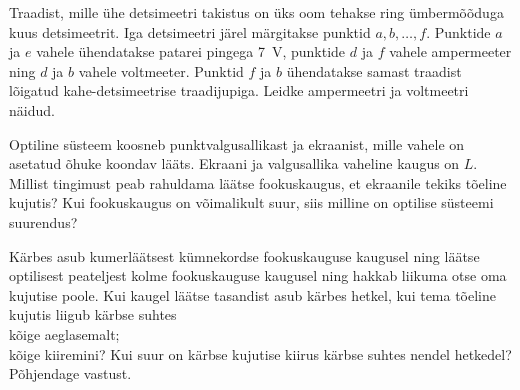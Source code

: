 \documentclass[10pt]{article}
\begin{document}

Traadist, mille ühe detsimeetri takistus on üks oom tehakse ring ümbermõõduga kuus detsimeetrit. Iga detsimeetri järel märgitakse punktid $a, b, \ldots, f$. Punktide $a$ ja $e$ vahele ühendatakse patarei pingega \SI{7}{V}, punktide $d$ ja $f$ vahele ampermeeter ning $d$ ja $b$ vahele voltmeeter. Punktid $f$ ja $b$ ühendatakse samast traadist lõigatud kahe-detsimeetrise traadijupiga. Leidke ampermeetri ja voltmeetri näidud.
\probend
\bigskip


Optiline süsteem koosneb punktvalgusallikast ja ekraanist, mille vahele on asetatud õhuke koondav lääts. Ekraani ja valgusallika vaheline kaugus on $L$. Millist tingimust peab rahuldama läätse fookuskaugus, et ekraanile tekiks tõeline kujutis? Kui fookuskaugus on võimalikult suur, siis milline on optilise süsteemi suurendus?
\probend
\bigskip

\setAuthor{}

Kärbes asub kumerläätsest kümnekordse fookuskauguse kaugusel ning läätse optilisest peateljest kolme fookuskauguse kaugusel ning hakkab liikuma otse oma kujutise poole. Kui kaugel läätse tasandist asub kärbes hetkel, kui tema tõeline kujutis liigub kärbse suhtes\\
\osa kõige aeglasemalt;\\
\osa kõige kiiremini? Kui suur on kärbse kujutise kiirus kärbse suhtes nendel hetkedel? Põhjendage vastust.
\probend
\bigskip

\setAuthor{}
\end{document}
